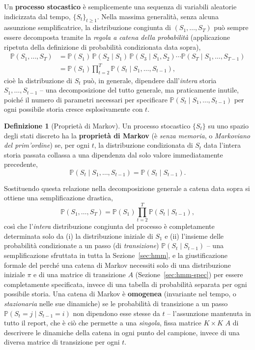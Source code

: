 \documentclass[11pt]{article}
\theoremstyle{definition}
\newtheorem{definition}[theorem]{Definizione}
\theoremstyle{remark}
\begin{document}
Un \textbf{processo stocastico} \`e semplicemente una sequenza di variabili aleatorie indicizzata dal tempo, $\{S_t\}_{t\ge1}$. Nella massima generalit\`a, senza alcuna assunzione semplificatrice, la distribuzione congiunta di $(S_1,\dots,S_T)$ pu\`o sempre essere decomposta tramite la \emph{regola a catena della probabilit\`a} (applicazione ripetuta della definizione di probabilit\`a condizionata data sopra),
\begin{align*}
\mathbb{P}(S_1,\dots,S_T) &= \mathbb{P}(S_1)\,\mathbb{P}(S_2\mid S_1)\,\mathbb{P}(S_3\mid S_1,S_2)\cdots\mathbb{P}(S_T\mid S_1,\dots,S_{T-1}) \\
&= \mathbb{P}(S_1)\prod_{t=2}^{T}\mathbb{P}(S_t\mid S_1,\dots,S_{t-1}),
\end{align*}
cio\`e la distribuzione di $S_t$ pu\`o, in generale, dipendere dall'\emph{intera} storia $S_1,\dots,S_{t-1}$ -- una decomposizione del tutto generale, ma praticamente inutile, poich\'e il numero di parametri necessari per specificare $\mathbb{P}(S_t\mid S_1,\dots,S_{t-1})$ per ogni possibile storia cresce esplosivamente con $t$.

\begin{definition}[Propriet\`a di Markov]
Un processo stocastico $\{S_t\}$ su uno spazio degli stati discreto ha la \textbf{propriet\`a di Markov} (\`e \emph{senza memoria}, o \emph{Markoviano del prim'ordine}) se, per ogni $t$, la distribuzione condizionata di $S_t$ data l'intera storia passata collassa a una dipendenza dal solo valore immediatamente precedente,
\[
\mathbb{P}(S_t\mid S_1,\dots,S_{t-1}) = \mathbb{P}(S_t\mid S_{t-1}).
\]
\end{definition}
Sostituendo questa relazione nella decomposizione generale a catena data sopra si ottiene una semplificazione drastica,
\[
\mathbb{P}(S_1,\dots,S_T) = \mathbb{P}(S_1)\prod_{t=2}^{T}\mathbb{P}(S_t\mid S_{t-1}),
\]
cos\`i che l'\emph{intera} distribuzione congiunta del processo \`e completamente determinata solo da (i) la distribuzione iniziale di $S_1$ e (ii) l'insieme delle probabilit\`a condizionate a un passo (di \emph{transizione}) $\mathbb{P}(S_t\mid S_{t-1})$ -- una semplificazione sfruttata in tutta la Sezione~\ref{sec:hmm}, e la giustificazione formale del perch\'e una catena di Markov necessiti solo di una distribuzione iniziale $\pi$ e di una matrice di transizione $A$ (Sezione~\ref{sec:hmm-spec}) per essere completamente specificata, invece di una tabella di probabilit\`a separata per ogni possibile storia. Una catena di Markov \`e \textbf{omogenea} (invariante nel tempo, o \emph{stazionaria} nelle sue dinamiche) se le probabilit\`a di transizione a un passo $\mathbb{P}(S_t=j\mid S_{t-1}=i)$ non dipendono esse stesse da $t$ -- l'assunzione mantenuta in tutto il report, che \`e ci\`o che permette a una \emph{singola}, fissa matrice $K\times K$ $A$ di descrivere le dinamiche della catena in ogni punto del campione, invece di una diversa matrice di transizione per ogni $t$.
\end{document}
